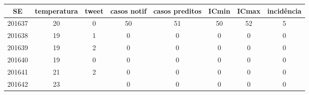 \begin{tabular}{c|ccccccc}
  \hline
SE & temperatura & tweet & casos notif & casos preditos & ICmin & ICmax & incidência \\ 
  \hline
201637 & 20 & 0 & 50 & 51 & 50 & 52 & 5 \\ 
  201638 & 19 & 1 & 0 & 0 & 0 & 0 & 0 \\ 
  201639 & 19 & 2 & 0 & 0 & 0 & 0 & 0 \\ 
  201640 & 19 & 0 & 0 & 0 & 0 & 0 & 0 \\ 
  201641 & 21 & 2 & 0 & 0 & 0 & 0 & 0 \\ 
  201642 & 23 &  & 0 & 0 & 0 & 0 & 0 \\ 
   \hline
\end{tabular}
